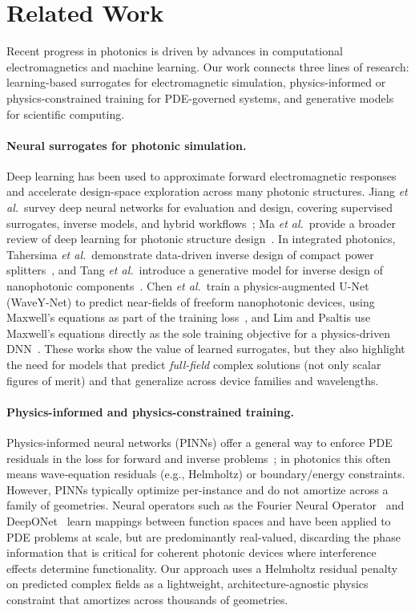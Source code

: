 \section{\label{sec:related}Related Work}

Recent progress in photonics is driven by advances in computational electromagnetics and machine learning. Our work
connects three lines of research: learning-based surrogates for electromagnetic simulation, physics-informed or
physics-constrained training for PDE-governed systems, and generative models for scientific computing.

\paragraph{Neural surrogates for photonic simulation.}
Deep learning has been used to approximate forward electromagnetic responses and accelerate design-space exploration
across many photonic structures. Jiang \emph{et al.}\ survey deep neural networks for evaluation and design, covering
supervised surrogates, inverse models, and hybrid
workflows~\cite{Jiang2021DeepNNPhotonicDevices}; Ma \emph{et al.}\ provide a broader review of deep learning for
photonic structure design~\cite{Ma2021DLPhotonicsReview}. In integrated photonics, Tahersima \emph{et al.}\ demonstrate
data-driven inverse design of compact power splitters~\cite{Tahersima2019DNNSplitters}, and Tang \emph{et al.}\
introduce a generative model for inverse design of nanophotonic
components~\cite{Tang2020GenerativeLPR}. Chen \emph{et al.}\ train a physics-augmented U-Net~\cite{Ronneberger2015UNet}
(WaveY-Net) to predict near-fields of freeform nanophotonic devices, using Maxwell's equations as part of the training
loss~\cite{Chen2022WaveYNet}, and Lim and Psaltis use Maxwell's equations directly as the sole training objective for a
physics-driven DNN~\cite{Lim2022MaxwellNet}. These works show the value of learned surrogates, but they also highlight
the need for models that predict \emph{full-field} complex solutions (not only scalar figures of merit) and that
generalize across device families and wavelengths.

\paragraph{Physics-informed and physics-constrained training.}
Physics-informed neural networks (PINNs) offer a general way to enforce PDE residuals in the loss for forward and
inverse problems~\cite{Raissi2019PINNs}; in photonics this often means wave-equation residuals (e.g., Helmholtz) or
boundary/energy constraints. However, PINNs typically optimize per-instance and do not amortize across a family of
geometries. Neural operators such as the Fourier Neural Operator~\cite{Li2021FNO} and DeepONet~\cite{Lu2021DeepONet}
learn mappings between function spaces and have been applied to PDE problems at scale, but are predominantly
real-valued, discarding the phase information that is critical for coherent photonic devices where interference effects
determine functionality. Our approach uses a Helmholtz residual penalty on predicted complex fields as a lightweight,
architecture-agnostic physics constraint that amortizes across thousands of geometries.

